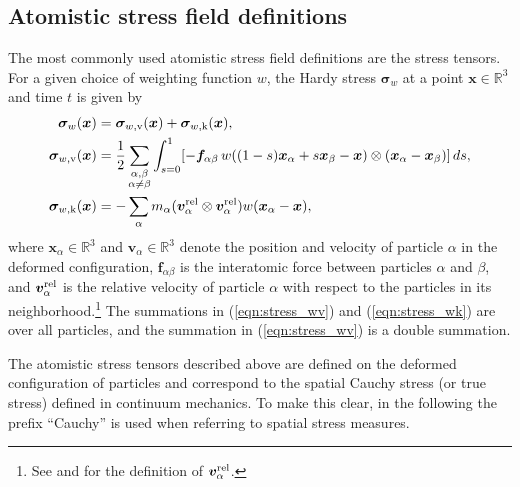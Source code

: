 \documentclass[authoryear]{elsarticle}
\newcommand{\stress}{\bm{\sigma}}
\newcommand{\eref}[1]{(\ref{#1})}
\begin{document}
\subsection{Atomistic stress field definitions}
The most commonly used atomistic stress field definitions are the
\cite{hardy1982} stress tensors. For a given
choice of weighting function $w$, the
Hardy stress $\stress_w$ at a point $\bm x \in \mathbb R^3$ and time $t$ is given by
\begin{align}
    \stress_{w}(\bm x) &= \stress_{w,\rm v}(\bm x) + \stress_{w,\rm k}(\bm
    x), \label{eqn:stress_w}\\
    \stress_{w,\rm v} (\bm x)
    &= \frac{1}{2} \sum_{\substack{\alpha,\beta \\  \alpha \neq \beta}} \int_{s=
    0}^{1} [-\bm{f}_{\alpha\beta}\, w((1-s)\bm{x}_\alpha + s\bm{x}_\beta-\bm{x})
    \otimes (\bm{x}_\alpha - \bm{x}_\beta)] \, ds, \label{eqn:stress_wv} \\
    \stress_{w,{\rm k}}(\bm{x}) &= - \sum_{\alpha} m_\alpha
    (\bm v_\alpha^{\rm rel} \otimes \bm v_\alpha^{\rm rel}) w(\bm{x}_\alpha -
    \bm{x}),\label{eqn:stress_wk}
\end{align}
where $\bm x_\alpha \in \mathbb R^3$ and $\bm v_\alpha \in \mathbb R^3$ denote the position and velocity of
particle $\alpha$ in the deformed configuration, $\bm f_{\alpha\beta}$ is the interatomic force between
particles $\alpha$ and $\beta$, and $\bm v_\alpha^{\rm{rel}}$ is the relative
velocity of particle $\alpha$ with respect to the particles in its
neighborhood.\footnote{See \cite{admal:tadmor:2015} and \cite{admal:tadmor:2015a} for the definition of $\bm v_\alpha^{\rm{rel}}$.}
The summations in \eref{eqn:stress_wv} and \eref{eqn:stress_wk} are over all particles, and the
summation in \eref{eqn:stress_wv} is a double summation.

The atomistic stress tensors described above are defined on the deformed
configuration of particles and correspond to the spatial Cauchy
stress (or true stress) defined in continuum mechanics.
To make this clear, in the following the prefix ``Cauchy'' is used
when referring to spatial stress measures.
\end{document}
